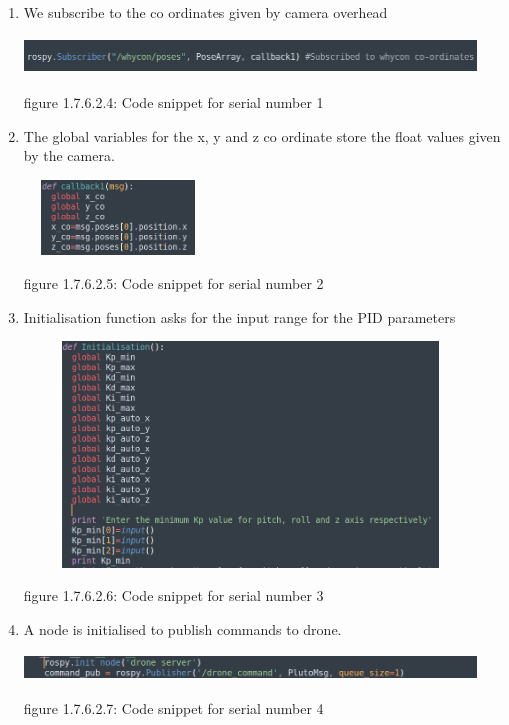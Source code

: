 \documentclass[a4paper,12pt,oneside]{book}
\begin{document}
\begin{enumerate}
\item We subscribe to the co ordinates given by camera overhead


\hspace{0.5cm}\includegraphics[width = 12cm , height= 1cm]{whycon_1.png}
\begin{center}
    figure 1.7.6.2.4: Code snippet for serial number 1
\end{center}
\item The global variables for the x, y and z co ordinate store the float values given by the camera.


\includegraphics[width = 5cm , height= 2cm]{Callback_2.png}
\begin{center}
    figure 1.7.6.2.5: Code snippet for serial number 2
\end{center}

\item Initialisation function asks for the input range for the PID parameters


\includegraphics[width = 12cm , height= 6cm]{Initialisation_3.png}
\begin{center}
    figure 1.7.6.2.6: Code snippet for serial number 3
\end{center}

\item A node is initialised to publish commands to drone.


\includegraphics[width = 12cm , height= 0.7cm]{Drone_pub_5.png}
\begin{center}
    figure 1.7.6.2.7: Code snippet for serial number 4
\end{center}


\end{enumerate}
\end{document}
